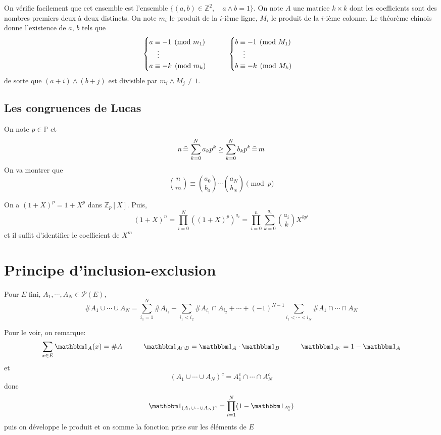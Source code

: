 On vérifie facilement que cet ensemble est l'ensemble $\{(a, b)\in\mathbb Z^2, \quad a\land b=1\}$. On note $A$ une matrice $k\times k$ dont les coefficients sont des nombres premiers deux à deux distincts. On note $m_i$ le produit de la $i$-ième ligne, $M_i$ le produit de la $i$-ième colonne. Le théorème chinois donne l'existence de $a$, $b$ tels que \[
    \begin{cases}
        a\equiv -1\pmod {m_1} \\
        \hspace{.4cm}\vdots \\
        a\equiv -k\pmod{m_k}
    \end{cases}
    \qquad \begin{cases}
        b\equiv -1\pmod {M_1}\\
        \hspace{.4cm}\vdots \\
        b\equiv -k\pmod{M_k}
    \end{cases}
\]
de sorte que $(a+i)\land (b+j)$ est divisible par $m_i\land M_j\neq 1$.

\subsection{Les congruences de Lucas}

On note $p\in\mathbb P$ et \[
    n\,\widehat=\,\sum_{k=0}^Na_kp^k\geq \sum_{k=0}^Nb_kp^k\,\widehat=\, m
\]
On va montrer que \[
    \binom nm\equiv \binom{a_0}{b_0}\cdots \binom{a_N}{b_N}\pmod p
\]

On a $(1+X)^p=1+X^p$ dans $\mathbb Z_p[X]$. Puis, \[
    (1+X)^n=\prod_{i=0}^N((1+X)^p)^{a_i}=\prod_{i=0}^n\sum_{k=0}^{a_i}\binom{a_i}{k}X^{kp^i}
\]
et il suffit d'identifier le coefficient de $X^m$

\section{Principe d'inclusion-exclusion}

Pour $E$ fini, $A_1, \cdots, A_N\in\mathcal P(E)$, \[
    \#A_1\cup\cdots \cup A_N=\sum_{i_1=1}^N\#A_{i_1}-\sum_{i_1<i_2}\#A_{i_1}\cap A_{i_2}+\cdots +(-1)^{N-1}\sum_{i_1<\cdots <i_N}\#A_1\cap \cdots \cap A_N
\]

Pour le voir, on remarque: \[
    \sum_{x\in E}\mathbbm 1_{A}(x)=\#A \qquad\quad \mathbbm 1_{A\cap B}=\mathbbm 1_A \cdot \mathbbm 1_B \qquad \quad \mathbbm 1_{A^c}=1-\mathbbm 1_A
\]
et \[
    (A_1\cup \cdots \cup A_N)^c=A_1^c\cap \cdots \cap A_N^c
\]
donc \[
    \mathbbm1_{(A_1\cup \cdots \cup A_N)^c}=\prod_{i=1}^N(1-\mathbbm 1_{A_i^c})
\]
puis on développe le produit et on somme la fonction prise sur les éléments de $E$


